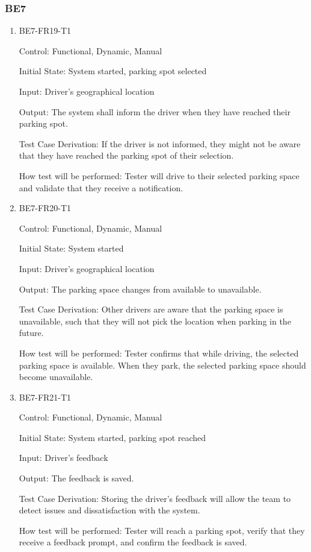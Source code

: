 \documentclass[12pt, titlepage]{article}
\begin{document}
\subsubsection{BE7}

\begin{enumerate}

\item{BE7-FR19-T1}

Control: Functional, Dynamic, Manual
					
Initial State: System started, parking spot selected
					
Input: Driver's geographical location
					
Output: The system shall inform the driver when they have reached their parking
spot.

Test Case Derivation: If the driver is not informed, they might not be aware
that they have reached the parking spot of their selection.
					
How test will be performed: Tester will drive to their selected parking space
and validate that they receive a notification.

\item{BE7-FR20-T1}

Control: Functional, Dynamic, Manual
					
Initial State: System started
					
Input: Driver's geographical location
					
Output: The parking space changes from available to unavailable.

Test Case Derivation: Other drivers are aware that the parking space is
unavailable, such that they will not pick the location when parking in the
future.
					
How test will be performed: Tester confirms that while driving, the selected
parking space is available. When they park, the selected parking space should
become unavailable.

\item{BE7-FR21-T1}

Control: Functional, Dynamic, Manual
					
Initial State: System started, parking spot reached
					
Input: Driver's feedback
					
Output: The feedback is saved.

Test Case Derivation: Storing the driver's feedback will allow the team to
detect issues and dissatisfaction with the system.
					
How test will be performed: Tester will reach a parking spot, verify that they
receive a feedback prompt, and confirm the feedback is saved.

\end{enumerate}
\end{document}

